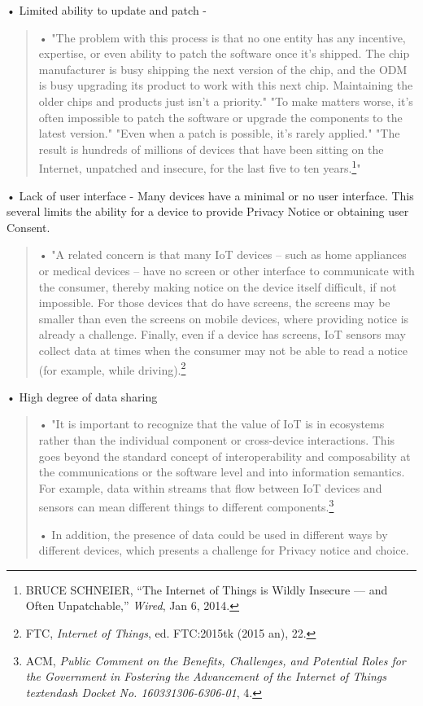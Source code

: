 • Limited ability to update and patch -

\begin{quote}
• "The problem with this process is that no one entity has any
incentive, expertise, or even ability to patch the software once it's
shipped. The chip manufacturer is busy shipping the next version of the
chip, and the ODM is busy upgrading its product to work with this next
chip. Maintaining the older chips and products just isn't a priority."
"To make matters worse, it's often impossible to patch the software or
upgrade the components to the latest version." "Even when a patch is
possible, it's rarely applied." "The result is hundreds of millions of
devices that have been sitting on the Internet, unpatched and insecure,
for the last five to ten years.\footnote{BRUCE SCHNEIER, ``The Internet
  of Things is Wildly Insecure --- and Often Unpatchable,''
  \emph{Wired}, Jan 6, 2014.}"
\end{quote}

• Lack of user interface - Many devices have a minimal or no user
interface. This several limits the ability for a device to provide
Privacy Notice or obtaining user Consent.

\begin{quote}
• "A related concern is that many IoT devices -- such as home appliances
or medical devices -- have no screen or other interface to communicate
with the consumer, thereby making notice on the device itself difficult,
if not impossible. For those devices that do have screens, the screens
may be smaller than even the screens on mobile devices, where providing
notice is already a challenge. Finally, even if a device has screens,
IoT sensors may collect data at times when the consumer may not be able
to read a notice (for example, while driving).\footnote{FTC,
  \emph{Internet of Things}, ed. FTC:2015tk (2015 an), 22.}
\end{quote}

• High degree of data sharing

\begin{quote}
• "It is important to recognize that the value of IoT is in ecosystems
rather than the individual component or cross-device interactions. This
goes beyond the standard concept of interoperability and composability
at the communications or the software level and into information
semantics. For example, data within streams that flow between IoT
devices and sensors can mean different things to different
components.\footnote{ACM, \emph{Public Comment on the Benefits,
  Challenges, and Potential Roles for the Government in Fostering the
  Advancement of the Internet of Things textendash Docket No.
  160331306-6306-01}, 4.}

• In addition, the presence of data could be used in different ways by
different devices, which presents a challenge for Privacy notice and
choice.
\end{quote}

